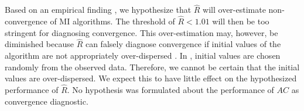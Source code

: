 \documentclass[article]{jss}
\begin{document}
Based on an empirical finding \citep{lace07}, we hypothesize that $\widehat{R}$ will over-estimate non-convergence of MI algorithms. The threshold of $\widehat{R} < 1.01$ will then be too stringent for diagnosing convergence. This over-estimation may, however, be diminished because $\widehat{R}$ can falsely diagnose convergence if initial values of the algorithm are not appropriately over-dispersed \cite[p~437]{broo98}. In , initial values are chosen randomly from the observed data. Therefore, we cannot be certain that the initial values are over-dispersed. We expect this to have little effect on the hypothesized performance of $\widehat{R}$. No hypothesis was formulated about the performance of $AC$ as convergence diagnostic.
%







% 
% 
% 
% 
\end{document}
